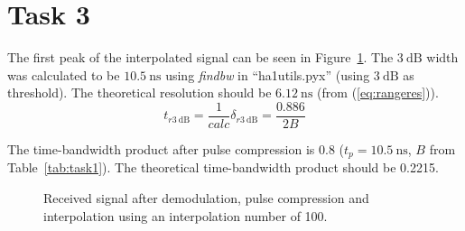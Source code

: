 \documentclass[12pt,a4paper]{article}
\begin{document}
\section{Task 3}\label{sec:3}
The first peak of the interpolated signal can be seen in Figure~\ref{fig:task3}. The $\SI{3}{\deci\bel}$ width was calculated to be $\SI{10.5}{\nano\second}$ using \textit{findbw} in ``ha1utils.pyx'' (using $\SI{3}{\deci\bel}$ as threshold).
The theoretical resolution should be $\SI{6.12}{\nano\second}$ (from (\ref{eq:rangeres})).
\begin{equation}
  \label{eq:rangeres}
  t_{r\SI{3}{\deci\bel}}=\frac{1}{calc}\delta_{r\SI{3}{\deci\bel}} = \frac{0.886}{2B}
\end{equation}

The time-bandwidth product after pulse compression is 0.8 ($t_p=\SI{10.5}{\nano\second}$, $B$ from Table~\ref{tab:task1}). The theoretical time-bandwidth product should be 0.2215.
\begin{figure}[h]
  \centering
  \noindent\makebox[\textwidth]{\scalebox{0.90}{}}
  \caption{Received signal after demodulation, pulse compression and interpolation using an interpolation number of 100.}
  \label{fig:task3}
\end{figure}
\end{document}
